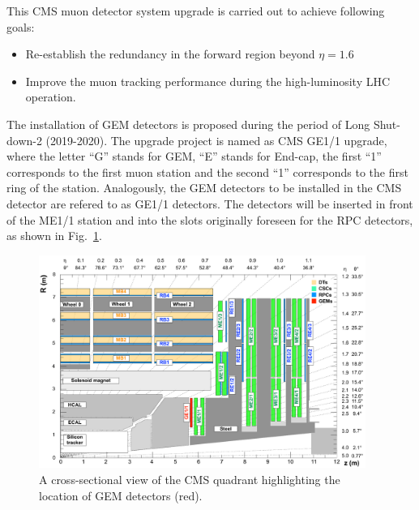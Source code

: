 This CMS muon detector system upgrade is carried out to achieve following goals:
\begin{itemize}
    \item Re-establish the redundancy in the forward region beyond $\eta = 1.6$
    \item Improve the muon tracking performance during the high-luminosity LHC operation.
\end{itemize}
The installation of GEM detectors is proposed during the period of Long Shut-down-2 (2019-2020).
The upgrade project is named as CMS GE1/1 upgrade, where the letter ``G'' stands for GEM, ``E'' stands for End-cap, the first ``1'' corresponds to the first muon station and the second ``1'' corresponds to the first ring of the station.
Analogously, the GEM detectors to be installed in the CMS detector are refered to as GE1/1 detectors.
The detectors will be inserted in front of the ME1/1 station and into the slots originally foreseen for the RPC detectors, as shown in Fig.~\ref{fig:GE1/1pos}. 
\begin{figure}[!htbp]
    \centering
    \includegraphics[width=0.95\textwidth]{figures/GEM/cms_upg_o_g_b_ni_ge1_r_140227.pdf}
    \caption{A cross-sectional view of the CMS quadrant highlighting the location of GEM detectors (red).}
    \label{fig:GE1/1pos}
\end{figure}

